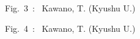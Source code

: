 \documentclass[12pt]{article}
\begin{document}
%
%
\begin{flushright} Fig.~3~:~ Kawano, T. (Kyushu U.) \end{flushright}
\vskip1cm
  \begin{center}
  \end{center}
\clearpage

%
%
\begin{flushright} Fig.~4~:~ Kawano, T. (Kyushu U.) \end{flushright}
\vskip1cm
  \begin{center}
  \end{center}
\clearpage
\end{document}
